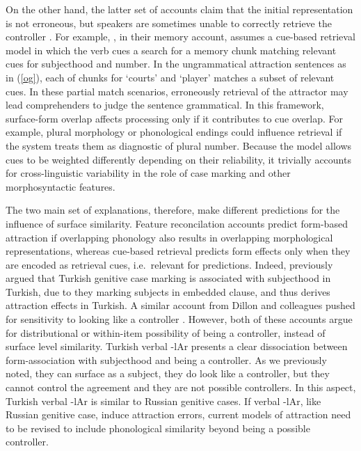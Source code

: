 \documentclass[
  authoryear,
  3p]{elsarticle}
\begin{document}
On the other hand, the latter set of accounts claim that the initial
representation is not erroneous, but speakers are sometimes unable to
correctly retrieve the controller
\citep{WagersEtAl:2009, Dillon2013a, RyskinEtAl2021}. For example,
\citet{WagersEtAl:2009}, in their memory account, assumes a cue-based
retrieval model in which the verb cues a search for a memory chunk
matching relevant cues for subjecthood and number. In the ungrammatical
attraction sentences as in (\ref{og}), each of chunks for `courts' and
`player' matches a subset of relevant cues. In these partial match
scenarios, erroneously retrieval of the attractor may lead comprehenders
to judge the sentence grammatical. In this framework, surface-form
overlap affects processing only if it contributes to cue overlap. For
example, plural morphology or phonological endings could influence
retrieval if the system treats them as diagnostic of plural number.
Because the model allows cues to be weighted differently depending on
their reliability, it trivially accounts for cross-linguistic
variability in the role of case marking and other morphosyntactic
features.

The two main set of explanations, therefore, make different predictions
for the influence of surface similarity. Feature reconcilation accounts
predict form-based attraction if overlapping phonology also results in
overlapping morphological representations, whereas cue-based retrieval
predicts form effects only when they are encoded as retrieval cues,
i.e.~relevant for predictions. Indeed, \citet{LagoEtAl2019} previously
argued that Turkish genitive case marking is associated with subjecthood
in Turkish, due to they marking subjects in embedded clause, and thus
derives attraction effects in Turkish. A similar account from Dillon and
colleagues pushed for sensitivity to looking like a controller
\citep{BhatiaDillon2022, BleotuDillon2024}. However, both of these
accounts argue for distributional or within-item possibility of being a
controller, instead of surface level similarity. Turkish verbal -lAr
presents a clear dissociation between form-association with subjecthood
and being a controller. As we previously noted, they can surface as a
subject, they do look like a controller, but they cannot control the
agreement and they are not possible controllers. In this aspect, Turkish
verbal -lAr is similar to Russian genitive cases. If verbal -lAr, like
Russian genitive case, induce attraction errors, current models of
attraction need to be revised to include phonological similarity beyond
being a possible controller.
\end{document}
